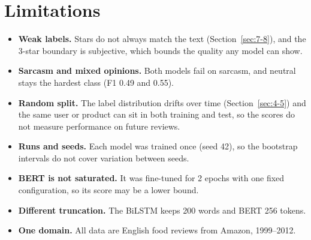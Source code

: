 \section{Limitations}
\label{sec:7-9}

\begin{itemize}
    \item \textbf{Weak labels.} Stars do not always match the text (Section~\ref{sec:7-8}), and the 3-star boundary is subjective, which bounds the quality any model can show.
    \item \textbf{Sarcasm and mixed opinions.} Both models fail on sarcasm, and neutral stays the hardest class (F1 0.49 and 0.55).
    \item \textbf{Random split.} The label distribution drifts over time (Section~\ref{sec:4-5}) and the same user or product can sit in both training and test, so the scores do not measure performance on future reviews.
    \item \textbf{Runs and seeds.} Each model was trained once (seed 42), so the bootstrap intervals do not cover variation between seeds.
    \item \textbf{BERT is not saturated.} It was fine-tuned for 2 epochs with one fixed configuration, so its score may be a lower bound.
    \item \textbf{Different truncation.} The BiLSTM keeps 200 words and BERT 256 tokens.
    \item \textbf{One domain.} All data are English food reviews from Amazon, 1999--2012.
\end{itemize}

